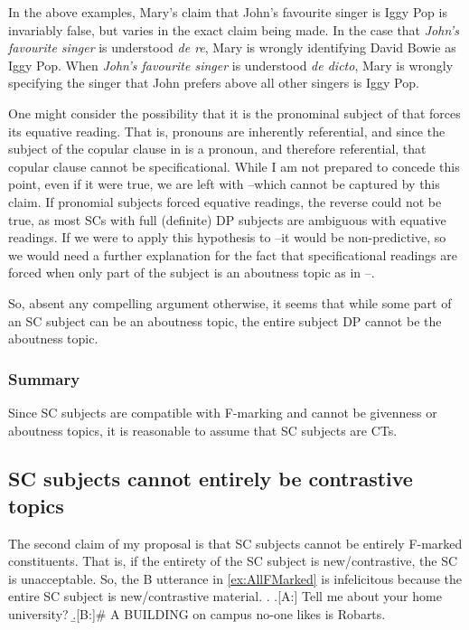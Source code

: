 \documentclass[letterpaper]{article}
\begin{document}
In the above examples, Mary's claim that John's favourite singer is Iggy Pop is invariably false, but varies in the exact claim being made.
In the case that \textit{John's favourite singer} is understood \textit{de re}, Mary is wrongly identifying David Bowie as Iggy Pop.
When \textit{John's favourite singer} is understood \textit{de dicto}, Mary is wrongly specifying the singer that John prefers above all other singers is Iggy Pop.

One might consider the possibility that it is the pronominal subject of \Last[a] that forces its equative reading.
That is, pronouns are inherently referential, and since the subject of the copular clause in \Last[a] is a pronoun, and therefore referential, that copular clause cannot be specificational. 
While I am not prepared to concede this point, even if it were true, we are left with \Last[b]--\Last[d] which cannot be captured by this claim.
If pronomial subjects forced equative readings, the reverse could not be true, as most SCs with full (definite) DP subjects are ambiguous with equative readings.
If we were to apply this hypothesis to \Last[b]--\Last[d] it would be non-predictive, so we would need a further explanation for the fact that specificational readings are forced when only part of the subject is an aboutness topic as in \Last[b]--\Last[d].

So, absent any compelling argument otherwise, it seems that while some part of an SC subject can be an aboutness topic, the entire subject DP cannot be the aboutness topic.

\subsubsection{Summary}
Since SC subjects are compatible with F-marking and cannot be givenness or aboutness topics, it is reasonable to assume that SC subjects are CTs.
\subsection{SC subjects cannot entirely be contrastive topics}
The second claim of my proposal is that SC subjects cannot be entirely F-marked constituents.
That is, if the entirety of the SC subject is new/contrastive, the SC is unacceptable.
So, the B utterance in \ref{ex:AllFMarked} is infelicitous because the entire SC subject is new/contrastive material.
\ex.\label{ex:AllFMarked}
\a.[A:] Tell me about your home university?
\b.[B:]\# A BUILDING on campus no-one likes is Robarts.
\end{document}
